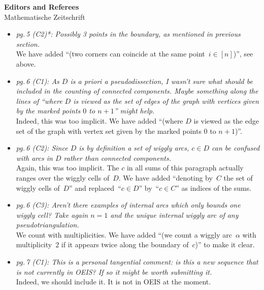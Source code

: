 \documentclass{letter}
\begin{document}
\begin{letter}{{\bf Editors and Referees} \\ Mathematische Zeitschrift}
\begin{itemize}
\item \textsl{\color{gray} pg.\,5 (C2)*: Possibly 3 points in the boundary, as mentioned in previous section.} \\
We have added ``(two corners can coincide at the same point~$i \in [n]$)'', see above.

\item \textsl{\color{gray} pg.\,6 (C1): As $D$ is a priori a pseudodissection, I wasn't sure what should be included in the counting of connected components. Maybe something along the lines of ``where $D$ is viewed as the set of edges of the graph with vertices given by the marked points $0$ to $n+1$'' might help.} \\
Indeed, this was too implicit. We have added ``(where $D$ is viewed as the edge set of the graph with vertex set given by the marked points $0$ to $n+1$)''.

\item \textsl{\color{gray} pg.\,6 (C2): Since $D$ is by definition a set of wiggly arcs, $c \in D$ can be confused with arcs in $D$ rather than connected components.} \\
Again, this was too implicit. The $c$ in all sums of this paragraph actually ranges over the wiggly cells of~$D$. We have added ``denoting by~$C$ the set of wiggly cells of~$D$'' and replaced~``$c \in D$'' by~``$c \in C$'' as indices of the sums.

\item \textsl{\color{gray} pg.\,6 (C3): Aren’t there examples of internal arcs which only bounds one wiggly cell? Take again $n = 1$ and the unique internal wiggly arc of any pseudotriangulation.} \\
We count with multiplicities. We have added ``(we count a wiggly arc~$\alpha$ with multiplicity~$2$ if it appears twice along the boundary of~$c$)'' to make it clear.

\item \textsl{\color{gray} pg.\,7 (C1): This is a personal tangential comment: is this a new sequence that is not currently in OEIS? If so it might be worth submitting it.} \\
Indeed, we should include it. It is not in OEIS at the moment.


\end{itemize}
\end{letter}
\end{document}
